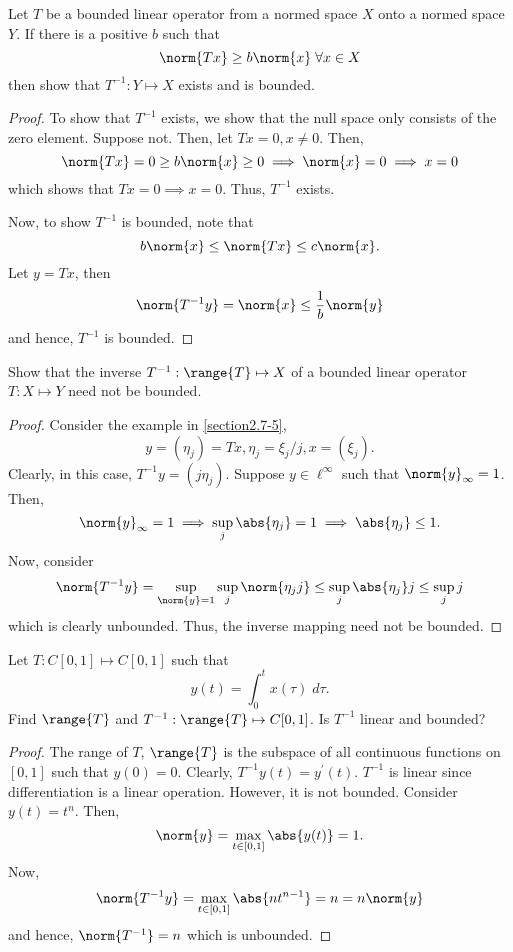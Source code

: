\begin{question}
    Let $T$ be a bounded linear operator from a normed space $X$ onto a normed space $Y$. If there is a positive $b$ such that 
    \[\norm{Tx} \geq b \norm{x} \;\forall x \in X\]
    then show that $T^{-1} : Y \mapsto X$ exists and is bounded.
    \label{section2.7-7}
\end{question}
\begin{proof}
    To show that $T^{-1}$ exists, we show that the null space only consists of the zero element. Suppose not. Then, let $Tx = 0 , x \neq 0$. Then,
    \[\norm{Tx} = 0 \geq b \norm{x} \geq 0 \implies \norm{x} = 0 \implies x = 0\]
    which shows that $Tx= 0 \implies x = 0$. Thus, $T^{-1}$ exists. 

    Now, to show $T^{-1}$ is bounded, note that
    \[b\norm{x} \leq \norm{Tx} \leq c \norm{x}.\]
    Let $y = Tx$, then
    \[\norm{T^{-1}y} = \norm{x} \leq \frac{1}{b}\norm{y}\]
    and hence, $T^{-1}$ is bounded.
\end{proof}

\begin{question}
    Show that the inverse $T^{-1} : \range{T} \mapsto X$ of a bounded linear operator $T : X \mapsto Y$ need not be bounded.
    \label{section2.7-8}
\end{question}
\begin{proof}
    Consider the example in \ref{section2.7-5},
    \[y = (\eta_j) = Tx, \eta_j = \xi_j/j , x = (\xi_j).\]
    Clearly, in this case, $T^{-1}y = (j\eta_j)$. Suppose $y \in \ell^\infty$ such that $\norm{y}_\infty = 1$. Then,
    \[\norm{y}_\infty = 1 \implies \sup_{j}\abs{\eta_j} = 1 \implies \abs{\eta_j} \leq 1.\]
    Now, consider
    \[\norm{T^{-1}y} = \sup_{\norm{y} = 1} \sup_{j} \norm{\eta_j j} \leq \sup_j \abs{\eta_j} j \leq \sup_j j\]
    which is clearly unbounded. Thus, the inverse mapping need not be bounded.
\end{proof}

\begin{question}
    Let $T : C[0,1] \mapsto C[0,1]$ such that
    \[y(t) = \int_{0}^t x(\tau) \;d\tau.\]
    Find $\range{T}$ and $T^{-1} : \range{T} \mapsto C[0,1]$. Is $T^{-1}$ linear and bounded?
    \label{section2.7-9}
\end{question}
\begin{proof}
    The range of $T$, $\range{T}$ is the subspace of all continuous functions on $[0,1]$ such that $y(0) = 0.$ Clearly, $T^{-1}y(t) = y^\prime(t)$. $T^{-1}$ is linear since differentiation is a linear operation. However, it is not bounded. Consider $y(t) = t^n$. Then, 
    \[\norm{y} = \max_{t \in [0,1]} \abs{y(t)} = 1.\]
    Now, 
    \[\norm{T^{-1}y} = \max_{t \in [0,1]} \abs{nt^{n-1}} = n = n\norm{y}\]
    and hence, $\norm{T^{-1}} = n$ which is unbounded.
\end{proof}

